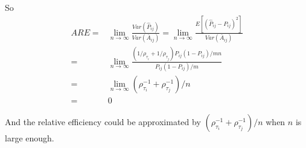 \documentclass[a4paper]{article}
\begin{document}
So
\begin{align*}
	ARE = & \lim_{n \rightarrow \infty} \frac{Var(\hat{P}_{ij})}{Var(\bar{A}_{ij})}
    = \lim_{n \rightarrow \infty} \frac{E[(\hat{P}_{ij} - P_{ij})^2]}{Var(\bar{A}_{ij})} \\
    = & \lim_{n \rightarrow \infty}
    \frac{\left( 1/\rho_{\tau_i} + 1/\rho_{\tau_j} \right) P_{ij} (1-P_{ij})/mn}
    {P_{ij} (1-P_{ij})/m} \\
    = & \lim_{n \rightarrow \infty} \left( \rho_{\tau_i}^{-1} + \rho_{\tau_j}^{-1}\right)/n \\
    = & 0
\end{align*}

And the relative efficiency could be approximated by $\left( \rho_{\tau_i}^{-1} + \rho_{\tau_j}^{-1}\right)/n$ when $n$ is large enough.
\end{document}
